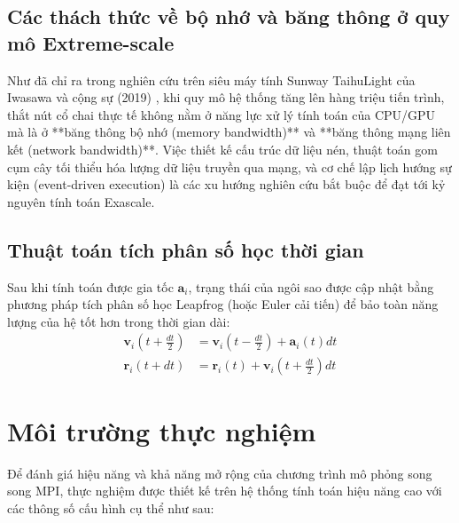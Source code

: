 \documentclass[12pt]{article}
\begin{document}
\subsection{Các thách thức về bộ nhớ và băng thông ở quy mô Extreme-scale}
Như đã chỉ ra trong nghiên cứu trên siêu máy tính Sunway TaihuLight của Iwasawa và cộng sự (2019) \cite{iwasawa2019}, khi quy mô hệ thống tăng lên hàng triệu tiến trình, thắt nút cổ chai thực tế không nằm ở năng lực xử lý tính toán của CPU/GPU mà là ở **băng thông bộ nhớ (memory bandwidth)** và **băng thông mạng liên kết (network bandwidth)**. Việc thiết kế cấu trúc dữ liệu nén, thuật toán gom cụm cây tối thiểu hóa lượng dữ liệu truyền qua mạng, và cơ chế lập lịch hướng sự kiện (event-driven execution) \cite{dekate2011} là các xu hướng nghiên cứu bắt buộc để đạt tới kỷ nguyên tính toán Exascale.

\subsection{Thuật toán tích phân số học thời gian}
Sau khi tính toán được gia tốc $\mathbf{a}_i$, trạng thái của ngôi sao được cập nhật bằng phương pháp tích phân số học Leapfrog (hoặc Euler cải tiến) để bảo toàn năng lượng của hệ tốt hơn trong thời gian dài:
\begin{align}
\mathbf{v}_i\left(t + \frac{dt}{2}\right) &= \mathbf{v}_i\left(t - \frac{dt}{2}\right) + \mathbf{a}_i(t) dt \\
\mathbf{r}_i(t + dt) &= \mathbf{r}_i(t) + \mathbf{v}_i\left(t + \frac{dt}{2}\right) dt
\end{align}

\section{Môi trường thực nghiệm}
\label{sec:experiment}

Để đánh giá hiệu năng và khả năng mở rộng của chương trình mô phỏng song song MPI, thực nghiệm được thiết kế trên hệ thống tính toán hiệu năng cao với các thông số cấu hình cụ thể như sau:
\end{document}
